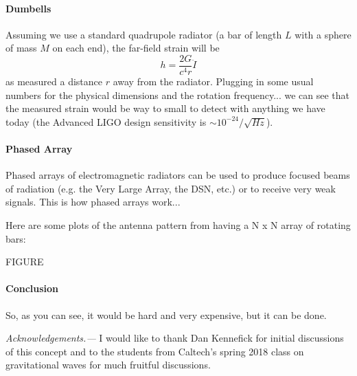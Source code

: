 \documentclass[aps,prl,twocolumn,showpacs,superscriptaddress,groupedaddress]{revtex4-2}  %
\begin{document}
\paragraph{Dumbells}
Assuming we use a standard quadrupole radiator (a bar of length $L$ with
a sphere of mass $M$ on each end), the far-field strain will be
\begin{equation}
h = \frac{2 G}{c^4 r} \ddot{I}
\end{equation}
as measured a distance $r$ away from the radiator.
Plugging in some usual numbers for the physical dimensions and the rotation
frequency...
we can see that the measured strain would be way to small to detect with
anything we have today (the Advanced LIGO design sensitivity is
$\sim 10^{-24} / \sqrt{Hz}$).

\paragraph{Phased Array}
Phased arrays of electromagnetic radiators can be used to produce focused beams
of radiation (e.g. the Very Large Array, the DSN, etc.) or to receive very weak
signals.
This is how phased arrays work...

Here are some plots of the antenna pattern from having a N x N array of
rotating bars:

FIGURE


\paragraph{Conclusion}
So, as you can see, it would be hard and very expensive, but it can be done.


{\it Acknowledgements.---}
I would like to thank Dan Kennefick for initial discussions of this
concept and to the students from Caltech's spring 2018 class on
gravitational waves for much fruitful discussions.


\end{document}
